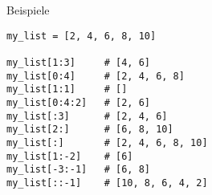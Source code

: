 \begin{fragile}
\begin{exampleblock}{Beispiele}
\begin{overprint}
\begin{verbatim}
my_list = [2, 4, 6, 8, 10]

my_list[1:3]     # [4, 6]
my_list[0:4]     # [2, 4, 6, 8]
my_list[1:1]     # []
my_list[0:4:2]   # [2, 6]
my_list[:3]      # [2, 4, 6]
my_list[2:]      # [6, 8, 10]
my_list[:]       # [2, 4, 6, 8, 10]
my_list[1:-2]    # [6]
my_list[-3:-1]   # [6, 8] 
my_list[::-1]    # [10, 8, 6, 4, 2]  
\end{verbatim}

\end{overprint}
\end{exampleblock}
\end{fragile}







